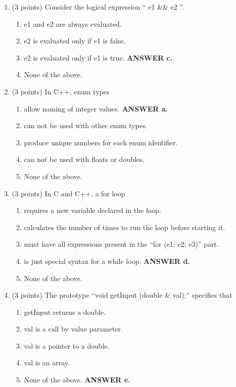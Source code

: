 \documentclass{article}
\newcommand{\ans}[1]{ \ifnum\showans=1 {\bf ANSWER #1.} \fi }
\begin{document}
\begin{enumerate}
\item (3 points) Consider the logical expression `` e1 \&\& e2 ''.
  \begin{enumerate}
  \item e1 and e2 are always evaluated.
  \item e2 is evaluated only if e1 is false.
  \item e2 is evaluated only if e1 is true.  \ans{c}
  \item None of the above.
  \end{enumerate}

\item (3 points) In C++, enum types 
  \begin{enumerate}
  \item allow naming of integer values.  \ans{a}
  \item can not be used with other enum types.
  \item produce unique numbers for each enum identifier.
  \item can not be used with floats or doubles.
  \item None of the above.
  \end{enumerate}

\item (3 points) In C and C++, a for loop
  \begin{enumerate}
  \item requires a new variable declared in the loop.
  \item calculates the number of times to run the loop before starting it.
  \item must have all expressions present in the ``for (e1; e2; e3)'' part.
  \item is just special syntax for a while loop.  \ans{d}
  \item None of the above.
  \end{enumerate}

\newpage
\item (3 points) The prototype ``void getInput (double \& val);''
specifies that
  \begin{enumerate}
  \item getInput returns a double.
  \item val is a call by value parameter.
  \item val is a pointer to a double.
  \item val is an array.
  \item None of the above.  \ans{e}
  \end{enumerate}


\end{enumerate}
\end{document}
